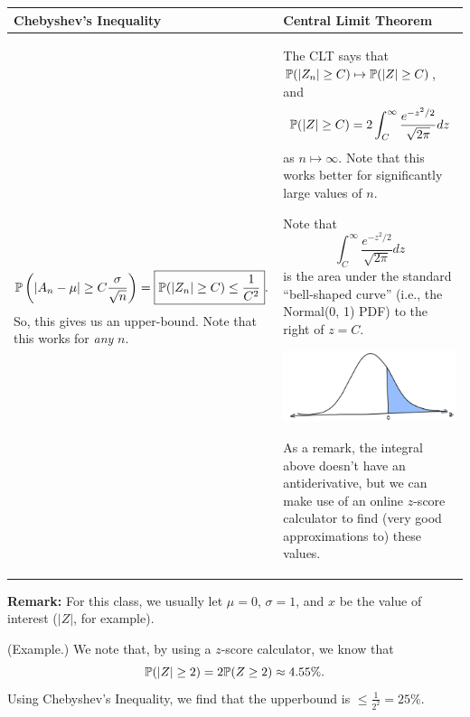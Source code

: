 \documentclass[letterpaper]{article}
\begin{document}
\begin{center}
    \begin{tabular}{||p{3in}|p{3in}||}
        \hline 
        \textbf{Chebyshev's Inequality} & \textbf{Central Limit Theorem} \\ 
        \hline \hline 
        \[\mathbb{P}\left(|A_n - \mu| \geq C \frac{\sigma}{\sqrt{n}}\right) = \boxed{\mathbb{P}(|Z_n| \geq C) \leq \frac{1}{C^2}}.\] 
        So, this gives us an upper-bound. Note that this works for \emph{any} $n$. 
        
        & 
        
        The CLT says that $\mathbb{P}(|Z_n| \geq C) \mapsto \mathbb{P}(|Z| \geq C)$, and 
        \[\mathbb{P}(|Z| \geq C) = 2\int_{C}^{\infty} \frac{e^{-z^2 / 2}}{\sqrt{2\pi}} dz\]
        as $n \mapsto \infty$. Note that this works better for significantly large values of $n$.

        \bigskip 

        Note that \[\int_{C}^{\infty} \frac{e^{-z^2 / 2}}{\sqrt{2\pi}} dz\] is the area under the standard ``bell-shaped curve'' (i.e., the Normal(0, 1) PDF) to the right of $z = C$.
        \begin{center}
            \includegraphics[scale=0.26]{../assets/lec20clt.png}
        \end{center}
        As a remark, the integral above doesn't have an antiderivative, but we can make use of an online $z$-score calculator to find (very good approximations to) these values.
        \\ 
        \hline 
    \end{tabular}
\end{center}
\textbf{Remark:} For this class, we usually let $\mu = 0$, $\sigma = 1$, and $x$ be the value of interest ($|Z|$, for example).

\begin{mdframed}[]
    (Example.) We note that, by using a $z$-score calculator, we know that 
    \[\mathbb{P}(|Z| \geq 2) = 2\mathbb{P}(Z \geq 2) \approx 4.55\%.\]
    Using Chebyshev's Inequality, we find that the upperbound is $\leq \frac{1}{2^2} = 25\%$. 
\end{mdframed}
\end{document}
